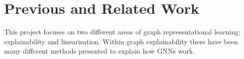 


%



\section{Previous and Related Work}
This project focuses on two different areas of graph representational learning: explainability and linearisation.
Within graph explainability there have been many different methods presented to explain how GNNs work.

